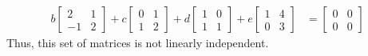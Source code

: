 \begin{enumerate}
\begin{align*}
b\begin{bmatrix} 2 & 1\\-1 & 2 \end{bmatrix} + 
c \begin{bmatrix} 0 & 1 \\ 1 & 2\end{bmatrix} + 
d \begin{bmatrix} 1 & 0 \\ 1 & 1 \end{bmatrix} + 
e \begin{bmatrix} 1 & 4 \\ 0 & 3 \end{bmatrix} 
&= 
\begin{bmatrix} 0 & 0 \\ 0 & 0 \end{bmatrix}
\end{align*}
%
Thus, this set of matrices is not linearly independent.
%
\end{enumerate}